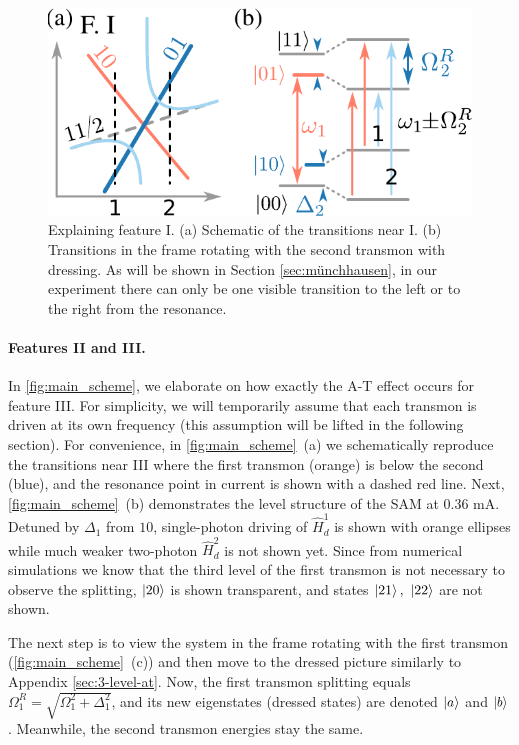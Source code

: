 \documentclass[%
 pra,
 amsmath,amssymb,
 reprint,%
]{revtex4-1}
\begin{document}
\begin{figure}
	\includegraphics[width=.9\linewidth]{topo_scheme}
	\caption{Explaining feature I. (a) Schematic of the transitions near I. (b) Transitions in the frame rotating with the second transmon with dressing. As will be shown in Section \ref{sec:münchhausen}, in our experiment there can only be one visible transition to the left or to the right from the resonance.}
	\label{fig:featureI}
\end{figure} 

\paragraph{Features II and III.}  

In \autoref{fig:main_scheme}, we elaborate on how 
exactly the A-T effect occurs for feature III. 
For simplicity, we will temporarily assume that 
each transmon is driven at its own frequency 
(this assumption will be lifted in the following 
section). For convenience, in 
\autoref{fig:main_scheme}~(a) we schematically 
reproduce the transitions near III where the 
first transmon (orange) is below the second 
(blue), and the resonance point in current is 
shown with a dashed red line. Next, 
\autoref{fig:main_scheme}~(b) demonstrates the 
level structure of the SAM at 0.36 mA. Detuned by 
$\Delta_1$ from $10$, single-photon driving of 
$\hat H_d^1$ is shown with orange ellipses while 
much weaker two-photon $\hat H_d^2$ is not shown 
yet. Since from numerical simulations we know 
that the third level of the first transmon is not 
necessary to observe the splitting, $\ket{20}$ is 
shown transparent, and states $\ket{21},\ 
\ket{22}$ are not shown.

The next step is to view the system in the frame 
rotating with the first transmon 
(\autoref{fig:main_scheme}~(c)) and then move to 
the  dressed picture similarly to Appendix 
\ref{sec:3-level-at}. Now, the first transmon 
splitting equals $\Omega_{1}^R = 
\sqrt{\Omega_1^2+\Delta_1^2}$, and its new 
eigenstates (dressed states) are denoted 
$\ket{a}$ and $\ket{b}$. Meanwhile, the second 
transmon energies stay the same.
\end{document}
